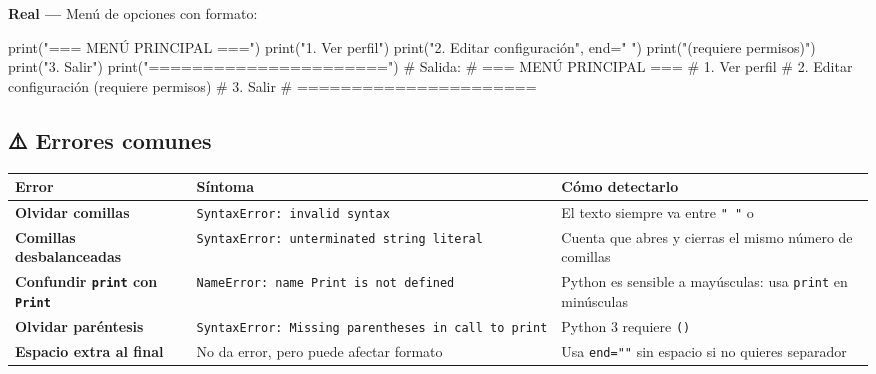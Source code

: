 \documentclass[
  doc,
  floatsintext,
  longtable,
  a4paper,
  nolmodern,
  notxfonts,
  notimes,
  12pt,
  colorlinks=true,linkcolor=blue,citecolor=blue,urlcolor=blue]{apa7}
\newenvironment{Shaded}{\begin{snugshade}}{\end{snugshade}}
\newcommand{\BuiltInTok}[1]{\textcolor[rgb]{0.00,0.23,0.31}{#1}}
\newcommand{\CommentTok}[1]{\textcolor[rgb]{0.37,0.37,0.37}{#1}}
\newcommand{\NormalTok}[1]{\textcolor[rgb]{0.00,0.23,0.31}{#1}}
\newcommand{\OperatorTok}[1]{\textcolor[rgb]{0.37,0.37,0.37}{#1}}
\newcommand{\StringTok}[1]{\textcolor[rgb]{0.13,0.47,0.30}{#1}}
\newcounter{none} %
\begin{document}
\textbf{Real ---} Menú de opciones con formato:

\begin{Shaded}
\begin{Highlighting}[]
\BuiltInTok{print}\NormalTok{(}\StringTok{"=== MENÚ PRINCIPAL ==="}\NormalTok{)}
\BuiltInTok{print}\NormalTok{(}\StringTok{"1. Ver perfil"}\NormalTok{)}
\BuiltInTok{print}\NormalTok{(}\StringTok{"2. Editar configuración"}\NormalTok{, end}\OperatorTok{=}\StringTok{" "}\NormalTok{)}
\BuiltInTok{print}\NormalTok{(}\StringTok{"(requiere permisos)"}\NormalTok{)}
\BuiltInTok{print}\NormalTok{(}\StringTok{"3. Salir"}\NormalTok{)}
\BuiltInTok{print}\NormalTok{(}\StringTok{"======================"}\NormalTok{)}
\CommentTok{\# Salida:}
\CommentTok{\# === MENÚ PRINCIPAL ===}
\CommentTok{\# 1. Ver perfil}
\CommentTok{\# 2. Editar configuración (requiere permisos)}
\CommentTok{\# 3. Salir}
\CommentTok{\# ======================}
\end{Highlighting}
\end{Shaded}

\subsection{⚠️ Errores comunes}\label{errores-comunes}

{\def\LTcaptype{none} %
\begin{longtable}[]{@{}
  >{\raggedright\arraybackslash}p{}
  >{\raggedright\arraybackslash}p{}
  >{\raggedright\arraybackslash}p{}@{}}
\toprule\noalign{}
\begin{minipage}[b]{\linewidth}\raggedright
Error
\end{minipage} & \begin{minipage}[b]{\linewidth}\raggedright
Síntoma
\end{minipage} & \begin{minipage}[b]{\linewidth}\raggedright
Cómo detectarlo
\end{minipage} \\
\midrule\noalign{}
\endhead
\bottomrule\noalign{}
\endlastfoot
\textbf{Olvidar comillas} & \texttt{SyntaxError:\ invalid\ syntax} & El
texto siempre va entre \texttt{"\ "} o
\texttt{\textquotesingle{}\ \textquotesingle{}} \\
\textbf{Comillas desbalanceadas} &
\texttt{SyntaxError:\ unterminated\ string\ literal} & Cuenta que abres
y cierras el mismo número de comillas \\
\textbf{Confundir \texttt{print} con \texttt{Print}} &
\texttt{NameError:\ name\ \textquotesingle{}Print\textquotesingle{}\ is\ not\ defined}
& Python es sensible a mayúsculas: usa \texttt{print} en minúsculas \\
\textbf{Olvidar paréntesis} &
\texttt{SyntaxError:\ Missing\ parentheses\ in\ call\ to\ \textquotesingle{}print\textquotesingle{}}
& Python 3 requiere \texttt{()} \\
\textbf{Espacio extra al final} & No da error, pero puede afectar
formato & Usa \texttt{end=""} sin espacio si no quieres separador \\
\end{longtable}
}
\end{document}
